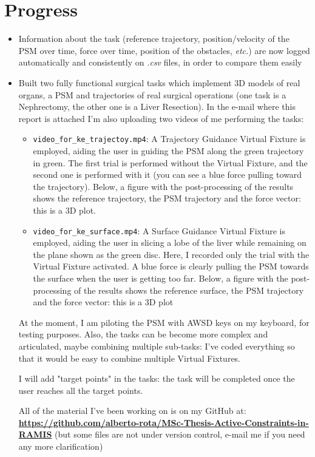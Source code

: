 \documentclass{article}
\begin{document}
\section*{Progress}
\begin{itemize}
    \item Information about the task (reference trajectory, position/velocity of the PSM over time, force over time, position of the obstacles, \textit{etc.}) are now logged automatically and consistently on \textit{.csv} files, in order to compare them easily
    \item Built two fully functional surgical tasks which implement 3D models of real organs, a PSM and trajectories of real surgical operations (one task is a Nephrectomy, the other one is a Liver Resection). In the e-mail where this report is attached I'm also uploading two videos of me performing the tasks:
    \begin{itemize}
        \item \texttt{video\_for\_ke\_trajectoy.mp4}: A Trajectory Guidance Virtual Fixture is employed, aiding the user in guiding the PSM along the green trajectory in green. The first trial is performed without the Virtual Fixture, and the second one is performed with it (you can see a blue force pulling toward the trajectory). Below, a figure with the post-processing of the results shows the reference trajectory, the PSM trajectory and the force vector: this is a 3D plot.
        \item \texttt{video\_for\_ke\_surface.mp4}: A Surface Guidance Virtual Fixture is employed, aiding the user in slicing a lobe of the liver while remaining on the plane shown as the green disc. Here, I recorded only the trial with the Virtual Fixture activated. A blue force is clearly pulling the PSM towards the surface when the user is getting too far. Below, a figure with the post-processing of the results shows the reference surface, the PSM trajectory and the force vector: this is a 3D plot
    \end{itemize}
    At the moment, I am piloting the PSM with AWSD keys on my keyboard, for testing purposes. Also, the tasks can be become more complex and articulated, maybe combining multiple sub-tasks: I've coded everything so that it would be easy to combine multiple Virtual Fixtures.

    I will add "target points" in the tasks: the task will be completed once the user reaches all the target points.

    All of the material I've been working on is on my GitHub at: \newline \textbf{\href{https://github.com/alberto-rota/MSc-Thesis-Active-Constraints-in-RAMIS}{https://github.com/alberto-rota/MSc-Thesis-Active-Constraints-in-RAMIS}} (but some files are not under version control, e-mail me if you need any more clarification)

\end{itemize}
\end{document}
